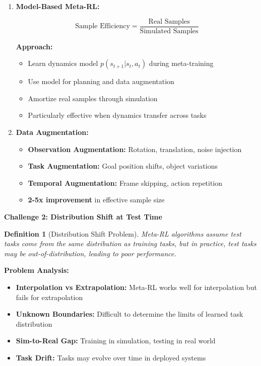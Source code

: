 \documentclass[12pt]{article}
\newcommand{\ieee}[1]{\textcolor{IEEEBlue}{\textbf{#1}}}
\newtheorem{definition}{Definition}
\begin{document}
{{\begin{enumerate}
				\item \textbf{Model-Based Meta-RL:}
				
				\begin{equation}
				\text{Sample Efficiency} = \frac{\text{Real Samples}}{\text{Simulated Samples}}
				\end{equation}
				
				\textbf{Approach:}
				\begin{itemize}
					\item Learn dynamics model $p(s_{t+1}|s_t, a_t)$ during meta-training
					\item Use model for planning and data augmentation
					\item Amortize real samples through simulation
					\item Particularly effective when dynamics transfer across tasks
				\end{itemize}
				
				\item \textbf{Data Augmentation:}
				
				\begin{itemize}
					\item \textbf{Observation Augmentation:} Rotation, translation, noise injection
					\item \textbf{Task Augmentation:} Goal position shifts, object variations
					\item \textbf{Temporal Augmentation:} Frame skipping, action repetition
					\item \textbf{2-5x improvement} in effective sample size
				\end{itemize}
			\end{enumerate}
			
			\ieee{Challenge 2: Distribution Shift at Test Time}
			
			\begin{definition}[Distribution Shift Problem]
			Meta-RL algorithms assume test tasks come from the same distribution as training tasks, but in practice, test tasks may be out-of-distribution, leading to poor performance.
			\end{definition}
			
			\textbf{Problem Analysis:}
			
			\begin{itemize}
				\item \textbf{Interpolation vs Extrapolation:} Meta-RL works well for interpolation but fails for extrapolation
				\item \textbf{Unknown Boundaries:} Difficult to determine the limits of learned task distribution
				\item \textbf{Sim-to-Real Gap:} Training in simulation, testing in real world
				\item \textbf{Task Drift:} Tasks may evolve over time in deployed systems
			\end{itemize}
			
}}
\end{document}
